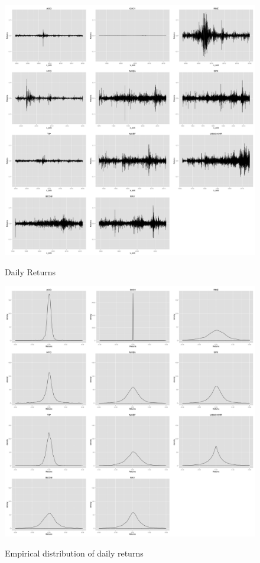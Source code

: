 \documentclass[12pt]{article}
\begin{document}
\begin{figure}[h]
\caption{Daily Returns} 
\centering 
\includegraphics[width=15cm]{../results/returns}
\label{fig: dailyReturns}
\end{figure}

\begin{figure}[h]
\caption{Empirical distribution of daily returns} 
\centering 
\includegraphics[width=15cm]{../results/returns_dist}
\label{fig: returnsDist}
\end{figure}
\end{document}
